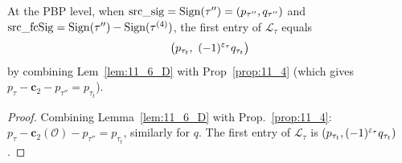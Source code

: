 \begin{corollary}
  \label{cor:11_6_pbp}
  \leanok
  At the PBP level, when $\mathrm{src\_sig} = \mathrm{Sign}(\tau'') = (p_{\tau''}, q_{\tau''})$
  and $\mathrm{src\_fcSig} = \mathrm{Sign}(\tau'') - \mathrm{Sign}(\tau^{(4)})$, the first entry of
  $\mathcal{L}_\tau$ equals
  \[ \big(p_{\tau_t},\ (-1)^{\varepsilon_\tau} q_{\tau_t}\big) \]
  by combining Lem~\ref{lem:11_6_D} with Prop~\ref{prop:11_4} (which gives $p_\tau - \mathbf{c}_2 - p_{\tau''} = p_{\tau_t}$).
\end{corollary}
\begin{proof}
  \leanok
  Combining Lemma~\ref{lem:11_6_D} with Prop.~\ref{prop:11_4}: $p_\tau - \mathbf{c}_2(\mathcal{O}) - p_{\tau''} = p_{\tau_t}$, similarly for $q$. The first entry of $\mathcal{L}_\tau$ is $(p_{\tau_t}, (-1)^{\varepsilon_\tau} q_{\tau_t})$.
\end{proof}

